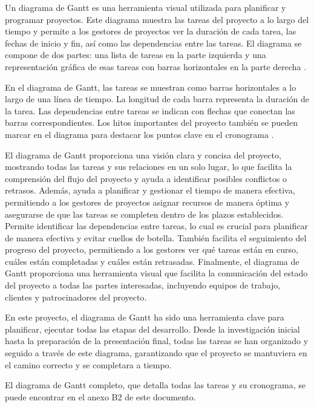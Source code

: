 Un diagrama de Gantt es una herramienta visual utilizada para planificar y programar proyectos. Este diagrama muestra las tareas del proyecto a lo largo del tiempo y permite a los gestores de proyectos ver la duración de cada tarea, las fechas de inicio y fin, así como las dependencias entre las tareas. El diagrama se compone de dos partes: una lista de tareas en la parte izquierda y una representación gráfica de esas tareas con barras horizontales en la parte derecha \cite{atlassian_gantt}.


En el diagrama de Gantt, las tareas se muestran como barras horizontales a lo largo de una línea de tiempo. La longitud de cada barra representa la duración de la tarea. Las dependencias entre tareas se indican con flechas que conectan las barras correspondientes. Los hitos importantes del proyecto también se pueden marcar en el diagrama para destacar los puntos clave en el cronograma \cite{atlassian_gantt}.

El diagrama de Gantt proporciona una visión clara y concisa del proyecto, mostrando todas las tareas y sus relaciones en un solo lugar, lo que facilita la comprensión del flujo del proyecto y ayuda a identificar posibles conflictos o retrasos. Además, ayuda a planificar y gestionar el tiempo de manera efectiva, permitiendo a los gestores de proyectos asignar recursos de manera óptima y asegurarse de que las tareas se completen dentro de los plazos establecidos. Permite identificar las dependencias entre tareas, lo cual es crucial para planificar de manera efectiva y evitar cuellos de botella. También facilita el seguimiento del progreso del proyecto, permitiendo a los gestores ver qué tareas están en curso, cuáles están completadas y cuáles están retrasadas. Finalmente, el diagrama de Gantt proporciona una herramienta visual que facilita la comunicación del estado del proyecto a todas las partes interesadas, incluyendo equipos de trabajo, clientes y patrocinadores del proyecto.

En este proyecto, el diagrama de Gantt ha sido una herramienta clave para planificar, ejecutar todas las etapas del desarrollo. Desde la investigación inicial hasta la preparación de la presentación final, todas las tareas se han organizado y seguido a través de este diagrama, garantizando que el proyecto se mantuviera en el camino correcto y se completara a tiempo.

El diagrama de Gantt completo, que detalla todas las tareas y su cronograma, se puede encontrar en el anexo B2 de este documento.


